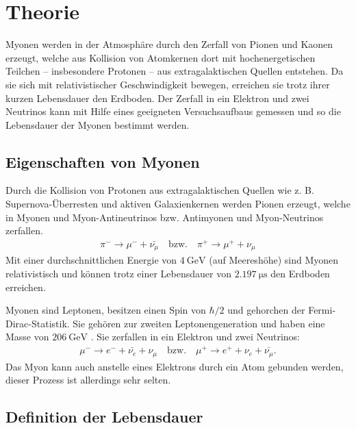 \section{Theorie}

Myonen werden in der Atmosphäre durch den Zerfall von Pionen und Kaonen erzeugt, welche aus Kollision von Atomkernen dort mit hochenergetischen Teilchen -- insbesondere Protonen -- aus extragalaktischen Quellen entstehen. Da sie sich mit relativistischer Geschwindigkeit bewegen, erreichen sie trotz ihrer kurzen Lebensdauer den Erdboden. Der Zerfall in ein Elektron und zwei Neutrinos kann mit Hilfe eines geeigneten Versuchsaufbaus gemessen und so die Lebensdauer der Myonen bestimmt werden.

\subsection{Eigenschaften von Myonen}

Durch die Kollision von Protonen aus extragalaktischen Quellen wie z. B. Supernova-Überresten und aktiven Galaxienkernen werden Pionen erzeugt, welche in Myonen und Myon-Antineutrinos bzw. Antimyonen und Myon-Neutrinos zerfallen.
\begin{align}
	\pi^- \to \mu^- + \bar{\nu_\mu} \quad \text{bzw.} \quad \pi^+ \to \mu^+ + \nu_\mu
\end{align}
Mit einer durchschnittlichen Energie von $\SI{4}{\giga\electronvolt}$ (auf Meereshöhe) \cite{PDG} sind Myonen relativistisch und können trotz einer Lebensdauer von $\SI{2.197}{\micro\second}$ \cite{PDG} den Erdboden erreichen.\par
Myonen sind Leptonen, besitzen einen Spin von $\hbar/2$ und gehorchen der Fermi-Dirac-Statistik. Sie gehören zur zweiten Leptonengeneration und haben eine Masse von $\SI{206}{\giga\electronvolt}$ \cite{PDG}. Sie zerfallen in ein Elektron und zwei Neutrinos:
\begin{align}
	\mu^- \to e^- + \bar{\nu_e} + \nu_\mu \quad \text{bzw.} \quad \mu^+ \to e^+ + \nu_e + \bar{\nu_\mu}.
\end{align}
Das Myon kann auch anstelle eines Elektrons durch ein Atom gebunden werden, dieser Prozess ist allerdings sehr selten.

\subsection{Definition der Lebensdauer}


